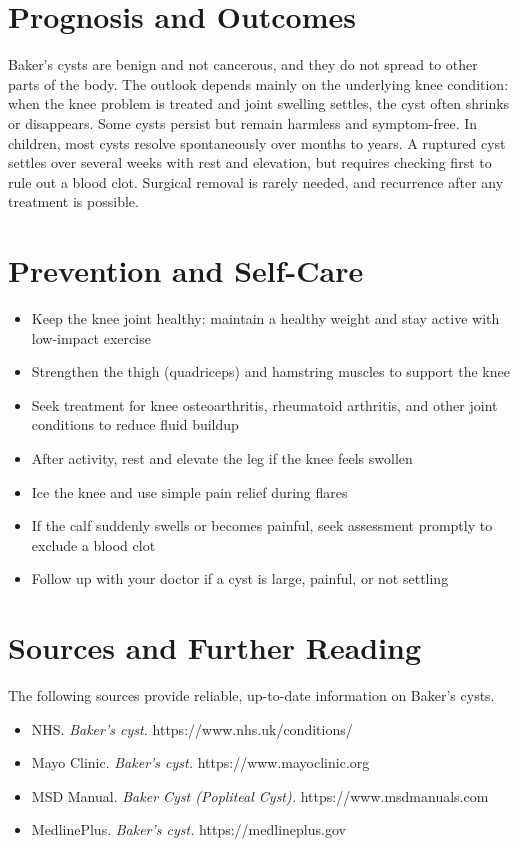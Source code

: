 \section*{Prognosis and Outcomes}
Baker's cysts are benign and not cancerous, and they do not spread to other parts of the body. The outlook depends mainly on the underlying knee condition: when the knee problem is treated and joint swelling settles, the cyst often shrinks or disappears. Some cysts persist but remain harmless and symptom-free. In children, most cysts resolve spontaneously over months to years. A ruptured cyst settles over several weeks with rest and elevation, but requires checking first to rule out a blood clot. Surgical removal is rarely needed, and recurrence after any treatment is possible.

\section*{Prevention and Self-Care}
\begin{itemize}
    \item Keep the knee joint healthy: maintain a healthy weight and stay active with low-impact exercise
    \item Strengthen the thigh (quadriceps) and hamstring muscles to support the knee
    \item Seek treatment for knee osteoarthritis, rheumatoid arthritis, and other joint conditions to reduce fluid buildup
    \item After activity, rest and elevate the leg if the knee feels swollen
    \item Ice the knee and use simple pain relief during flares
    \item If the calf suddenly swells or becomes painful, seek assessment promptly to exclude a blood clot
    \item Follow up with your doctor if a cyst is large, painful, or not settling
\end{itemize}

\section*{Sources and Further Reading}
The following sources provide reliable, up-to-date information on Baker's cysts.
\begin{itemize}
    \item NHS. \textit{Baker's cyst.} https://www.nhs.uk/conditions/
    \item Mayo Clinic. \textit{Baker's cyst.} https://www.mayoclinic.org
    \item MSD Manual. \textit{Baker Cyst (Popliteal Cyst).} https://www.msdmanuals.com
    \item MedlinePlus. \textit{Baker's cyst.} https://medlineplus.gov
\end{itemize}
